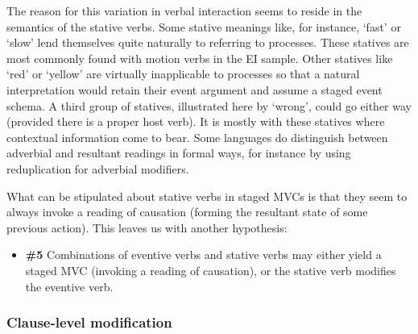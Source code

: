 The reason for this variation in verbal interaction seems to reside in the semantics of the stative verbs. Some stative meanings like, for instance, `fast' or `slow' lend themselves quite naturally to referring to processes. These statives are most commonly found with motion verbs in the EI sample. Other statives like `red' or `yellow' are virtually inapplicable to processes so that a natural interpretation would retain their event argument and assume a staged event schema. A third group of statives, illustrated here by `wrong', could go either way (provided there is a proper host verb). It is mostly with these statives where contextual information come to bear. Some languages do distinguish between adverbial and resultant readings in formal ways, for instance by using reduplication for adverbial modifiers.

What can be stipulated about stative verbs in staged MVCs is that they seem to always invoke a reading of causation (forming the resultant state of some previous action). This leaves us with another hypothesis:

\begin{itemize}
\item \textbf{\#5} Combinations of eventive verbs and stative verbs may either yield a staged MVC (invoking a reading of causation), or the stative verb modifies the eventive verb.
\end{itemize}

\subsubsection{Clause-level modification}\label{sec:clauselevelmodification}


